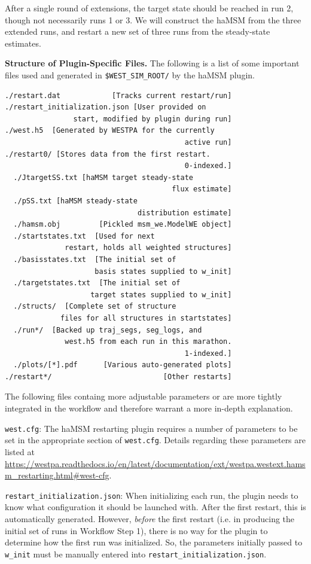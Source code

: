 After a single round of extensions, the target state should be reached in run 2, though not necessarily runs 1 or 3. 
We will construct the haMSM from the three extended runs, and restart a new set of three runs from the steady-state estimates.

\textbf{Structure of Plugin-Specific Files.} The following is a list of some important files used and generated in \verb|$WEST_SIM_ROOT/| by the haMSM plugin.
\pagebreak

\begin{verbatim}
./restart.dat            [Tracks current restart/run]
./restart_initialization.json [User provided on 
                start, modified by plugin during run]
./west.h5  [Generated by WESTPA for the currently 
                                          active run]
./restart0/ [Stores data from the first restart. 
                                          0-indexed.]
  ./JtargetSS.txt [haMSM target steady-state 
                                       flux estimate]
  ./pSS.txt [haMSM steady-state 
                               distribution estimate]
  ./hamsm.obj         [Pickled msm_we.ModelWE object]
  ./startstates.txt  [Used for next 
              restart, holds all weighted structures]
  ./basisstates.txt  [The initial set of 
                     basis states supplied to w_init]
  ./targetstates.txt  [The initial set of 
                    target states supplied to w_init]
  ./structs/  [Complete set of structure 
             files for all structures in startstates]
  ./run*/  [Backed up traj_segs, seg_logs, and 
              west.h5 from each run in this marathon.
                                          1-indexed.]
  ./plots/[*].pdf      [Various auto-generated plots]
./restart*/                          [Other restarts]
\end{verbatim}

The following files containg more adjustable parameters or are more tightly integrated in the workflow and therefore warrant a more in-depth explanation.

\verb|west.cfg|: The haMSM restarting plugin requires a number of parameters to be set in the appropriate section of \verb|west.cfg|. 
Details regarding these parameters are listed at {\url{https://westpa.readthedocs.io/en/latest/documentation/ext/westpa.westext.hamsm_restarting.html#west-cfg}}.

\verb|restart_initialization.json|: When initializing each run, the plugin needs to know what configuration it should be launched with. 
After the first restart, this is automatically generated. 
However, \textit{before} the first restart (i.e. in producing the initial set of runs in Workflow Step 1), there is no way for the plugin to determine how the first run was initialized. 
So, the parameters initially passed to \verb|w_init| must be manually entered into \verb|restart_initialization.json|.

